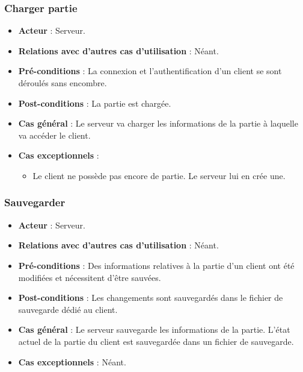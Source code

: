 \documentclass[a4paper,titlepage]{scrreprt}
\begin{document}
    \subsubsection{Charger partie}
      \begin{itemize}
        \item \textbf{Acteur}  : Serveur.
        \item \textbf{Relations avec d'autres cas d'utilisation}  : Néant.
        \item \textbf{Pré-conditions} : La connexion et l'authentification d'un client se sont déroulés sans encombre.
        \item \textbf{Post-conditions} : La partie est chargée.
        \item \textbf{Cas général} : Le serveur va charger les informations de la partie à laquelle va accéder le client.
        \item \textbf{Cas exceptionnels} : 
        \begin{itemize}
            \item Le client ne possède pas encore de partie. Le serveur lui en crée une.
          \end{itemize}
      \end{itemize}
    \subsubsection{Sauvegarder}
      \begin{itemize}
        \item \textbf{Acteur}  : Serveur.
        \item \textbf{Relations avec d'autres cas d'utilisation}  : Néant.
        \item \textbf{Pré-conditions} : Des informations relatives à la partie d'un client ont été modifiées et nécessitent d'être sauvées.
        \item \textbf{Post-conditions} : Les changements sont sauvegardés dans le fichier de sauvegarde dédié au client.
        \item \textbf{Cas général} : Le serveur sauvegarde les informations de la partie. L’état actuel de la partie du client est sauvegardée dans un fichier de sauvegarde.
        \item \textbf{Cas exceptionnels} : Néant.
      \end{itemize}
\end{document}
